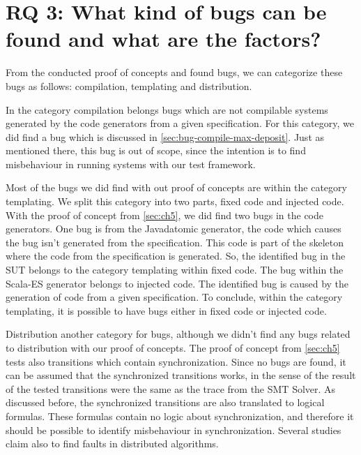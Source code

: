 
\section{RQ 3: What kind of bugs can be found and what are the factors?}

From the conducted proof of concepts and found bugs, we can categorize these bugs as follows: compilation, templating and distribution. 

In the category compilation belongs bugs which are not compilable systems generated by the code generators from a given specification. For this category, we did find a bug which is discussed in \autoref{sec:bug-compile-max-deposit}. Just as mentioned there, this bug is out of scope, since the intention is to find misbehaviour in running systems with our test framework.

Most of the bugs we did find with out proof of concepts are within the category templating. We split this category into two parts, fixed code and injected code. With the proof of concept from \autoref{sec:ch5}, we did find two bugs in the code generators. One bug is from the Javadatomic generator, the code which causes the bug isn't generated from the specification. This code is part of the skeleton where the code from the specification is generated. So, the identified bug in the SUT belongs to the category templating within fixed code. The bug within the Scala-ES generator belongs to injected code. The identified bug is caused by the generation of code from a given specification. To conclude, within the category templating, it is possible to have bugs either in fixed code or injected code.

Distribution another category for bugs, although we didn't find any bugs related to distribution with our proof of concepts. The proof of concept from \autoref{sec:ch5} tests also transitions which contain synchronization. Since no bugs are found, it can be assumed that the synchronized transitions works, in the sense of the result of the tested transitions were the same as the trace from the SMT Solver. As discussed before, the synchronized transitions are also translated to logical formulas. These formulas contain no logic about synchronization, and therefore it should be possible to identify misbehaviour in synchronization. Several studies claim also to find faults in distributed algorithms.


